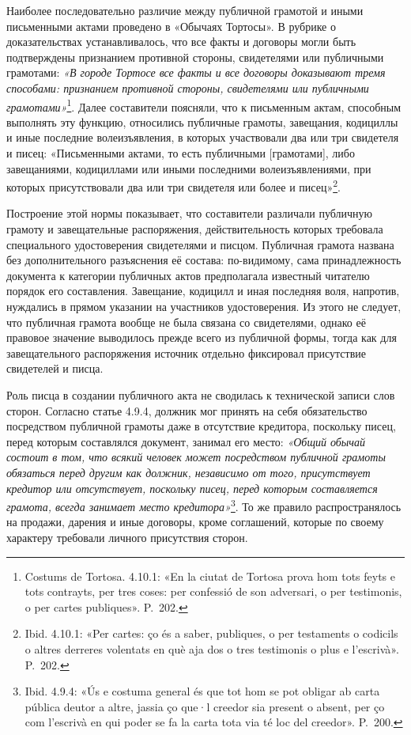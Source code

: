 Наиболее последовательно различие между публичной грамотой и иными письменными актами проведено в «Обычаях Тортосы». В рубрике о доказательствах устанавливалось, что все факты и договоры могли быть подтверждены признанием противной стороны, свидетелями или публичными грамотами:\emph{ «В городе Тортосе все факты и все договоры доказывают тремя способами: признанием противной стороны, свидетелями или публичными грамотами»}\footnote{Costums de Tortosa. 4.10.1: «En la ciutat de Tortosa prova hom tots feyts e tots contrayts, per tres coses: per confessió de son adversari, o per testimonis, o per cartes publiques». P.~202.}. Далее составители поясняли, что к письменным актам, способным выполнять эту функцию, относились публичные грамоты, завещания, кодициллы и иные последние волеизъявления, в которых участвовали два или три свидетеля и писец: «Письменными актами, то есть публичными [грамотами], либо завещаниями, кодициллами или иными последними волеизъявлениями, при которых присутствовали два или три свидетеля или более и писец»\footnote{Ibid. 4.10.1: «Per cartes: ço és a saber, publiques, o per testaments o codicils o altres derreres volentats en què aja dos o tres testimonis o plus e l’escrivà». P.~202.}.

Построение этой нормы показывает, что составители различали публичную грамоту и завещательные распоряжения, действительность которых требовала специального удостоверения свидетелями и писцом. Публичная грамота названа без дополнительного разъяснения её состава: по-видимому, сама принадлежность документа к категории публичных актов предполагала известный читателю порядок его составления. Завещание, кодицилл и иная последняя воля, напротив, нуждались в прямом указании на участников удостоверения. Из этого не следует, что публичная грамота вообще не была связана со свидетелями, однако её правовое значение выводилось прежде всего из публичной формы, тогда как для завещательного распоряжения источник отдельно фиксировал присутствие свидетелей и писца.

Роль писца в создании публичного акта не сводилась к технической записи слов сторон. Согласно статье 4.9.4, должник мог принять на себя обязательство посредством публичной грамоты даже в отсутствие кредитора, поскольку писец, перед которым составлялся документ, занимал его место: \emph{«Общий обычай состоит в том, что всякий человек может посредством публичной грамоты обязаться перед другим как должник, независимо от того, присутствует кредитор или отсутствует, поскольку писец, перед которым составляется грамота, всегда занимает место кредитора»}\footnote{Ibid. 4.9.4: «Ús e costuma general és que tot hom se pot obligar ab carta pública deutor a altre, jassia ço que·l creedor sia present o absent, per ço com l’escrivà en qui poder se fa la carta tota via té loc del creedor». P.~200.}. То же правило распространялось на продажи, дарения и иные договоры, кроме соглашений, которые по своему характеру требовали личного присутствия сторон.

